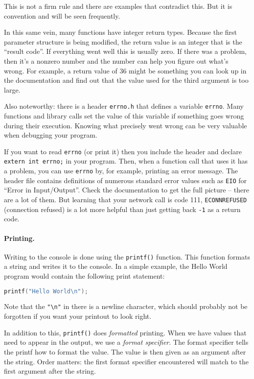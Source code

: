 This is not a firm rule and there are examples that contradict this. But it is convention and will be seen frequently.

In this same vein, many functions have integer return types. Because the first parameter structure is being modified, the return value is an integer that is the ``result code''. If everything went well this is usually zero. If there was a problem, then it's a nonzero number and the number can help you figure out what's wrong. For example, a return value of 36 might be something you can look up in the documentation and find out that the value used for the third argument is too large.

Also noteworthy: there is a header \texttt{errno.h} that defines a variable \texttt{errno}. Many functions and library calls set the value of this variable if something goes wrong during their execution. Knowing what precisely went wrong can be very valuable when debugging your program.

If you want to read \texttt{errno} (or print it) then you include the header and declare \texttt{extern int errno;}  in your program. Then, when a function call that uses it has a problem, you can use \texttt{errno} by, for example, printing an error message. The header file contains definitions of numerous standard error values such as \texttt{EIO} for ``Error in Input/Output''. Check the documentation to get the full picture -- there are a lot of them. But learning that your network call is code 111, \texttt{ECONNREFUSED} (connection refused) is a lot more helpful than just getting back \texttt{-1} as a return code.


\paragraph{Printing.}

Writing to the console is done using the \texttt{printf()} function. This function formats a string and writes it to the console. In a simple example, the Hello World program would contain the following print statement:

\begin{lstlisting}[language=C]
printf("Hello World\n");
\end{lstlisting}

Note that the \texttt{"\textbackslash n"} in there is a newline character, which should probably not be forgotten if you want your printout to look right.

In addition to this, \texttt{printf()} does \textit{formatted} printing. When we have values that need to appear in the output, we use a \textit{format specifier}. The format specifier tells the printf how to format the value. The value is then given as an argument after the string. Order matters: the first format specifier encountered will match to the first argument after the string.

